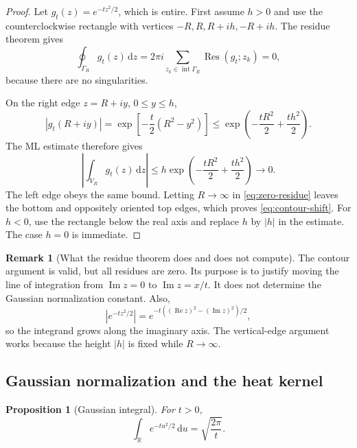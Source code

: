 \documentclass[10pt,a4paper]{article}
\numberwithin{equation}{section}
\theoremstyle{blueplain}
\newtheorem{proposition}[theorem]{Proposition}
\theoremstyle{definition}
\newtheorem{remark}[theorem]{Remark}
\newcommand{\R}{\mathbb R}
\newcommand{\dd}{\,\mathrm d}
\newcommand{\Res}{\operatorname{Res}}
\newcommand{\RePart}{\operatorname{Re}}
\newcommand{\ImPart}{\operatorname{Im}}
\begin{document}
\begin{proof}
Let \(g_t(z)=e^{-tz^2/2}\), which is entire.  First assume \(h>0\) and use the
counterclockwise rectangle with vertices
\(-R,R,R+ih,-R+ih\).  The residue theorem gives
\begin{equation}
  \oint_{\Gamma_R}g_t(z)\dd z
  =2\pi i\sum_{z_k\in\operatorname{int}\Gamma_R}\Res(g_t;z_k)=0,
  \label{eq:zero-residue}
\end{equation}
because there are no singularities.

On the right edge \(z=R+iy\), \(0\le y\le h\),
\[
  |g_t(R+iy)|
  =\exp\!\left[-\frac t2(R^2-y^2)\right]
  \le \exp\!\left(-\frac{tR^2}{2}+\frac{th^2}{2}\right).
\]
The ML estimate therefore gives
\begin{equation}
  \left|\int_{V_R}g_t(z)\dd z\right|
  \le h\exp\!\left(-\frac{tR^2}{2}+\frac{th^2}{2}\right)
  \longrightarrow0.
  \label{eq:vertical-bound}
\end{equation}
The left edge obeys the same bound.  Letting \(R\to\infty\) in
\eqref{eq:zero-residue} leaves the bottom and oppositely oriented top edges,
which proves \eqref{eq:contour-shift}.  For \(h<0\), use the rectangle below
the real axis and replace \(h\) by \(|h|\) in the estimate.  The case \(h=0\)
is immediate.
\end{proof}

\begin{remark}[What the residue theorem does and does not compute]
The contour argument is valid, but all residues are zero.  Its purpose is to
justify moving the line of integration from \(\ImPart z=0\) to
\(\ImPart z=x/t\).  It does not determine the Gaussian normalization constant.
Also,
\[
  |e^{-tz^2/2}|=e^{-t((\RePart z)^2-(\ImPart z)^2)/2},
\]
so the integrand grows along the imaginary axis.  The vertical-edge argument
works because the height \(|h|\) is fixed while \(R\to\infty\).
\end{remark}

\subsection{Gaussian normalization and the heat kernel}

\begin{proposition}[Gaussian integral]
For \(t>0\),
\begin{equation}
  \int_{\R}e^{-tu^2/2}\dd u=\sqrt{\frac{2\pi}{t}}.
  \label{eq:gaussian-integral}
\end{equation}
\end{proposition}
\end{document}
